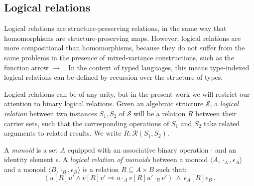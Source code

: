 \documentclass[sigplan,10pt,review,anonymous]{acmart}
\newcommand{\ifr}[1]{\mathrel{[{#1}]}}
\begin{document}


\subsection{Logical relations} %

Logical relations are structure-preserving relations,
in the same way that homomorphisms are structure-preserving maps.
However,
logical relations are more compositional than homomorphisms,
because they do not suffer from the same problems
in the presence of mixed-variance constructions,
such as the function arrow $\rightarrow$ \cite{lrp}.
In the context of typed languages,
this means type-indexed logical relations
can be defined by recursion over the structure of types.


Logical relations can be of any arity,
but in the present work
we will restrict our attention to
binary logical relations.
Given an algebraic structure $\mathcal{S}$,
a \emph{logical relation}
between two instances $S_1, S_2$ of $\mathcal{S}$
will be a relation $R$
between their carrier sets,
such that the corresponding operations of $S_1$ and $S_2$
take related arguments to related results.
We write $R : \mathcal{R}(S_1, S_2)$.

\begin{example}
\label{ex:monoid}
A \emph{monoid} is a set $A$ equipped with
an associative binary operation $\cdot$ and
an identity element $\epsilon$.
A \emph{logical relation of monoids} between
a monoid $\langle A, \cdot_A, \epsilon_A \rangle$ and
a monoid $\langle B, \cdot_B, \epsilon_B \rangle$
is a relation $R \subseteq A \times B$
such that:
\[
(u \ifr{R} u' \wedge v \ifr{R} v' \Rightarrow u \cdot_A v \ifr{R} u' \cdot_B
v')
\: \wedge \:
\epsilon_A \ifr{R} \epsilon_B \,.
\]
\end{example}
\end{document}

